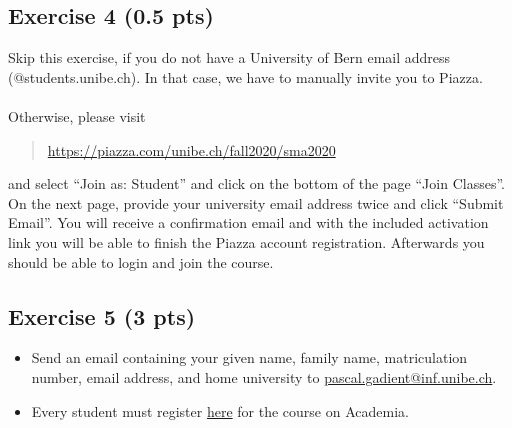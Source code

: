 \documentclass [11pt, a4wide, twoside]{article}
\begin{document}

\subsection*{Exercise 4 (0.5 pts)}
Skip this exercise, if you do not have a University of Bern email address (@students.unibe.ch). In that case, we have to manually invite you to Piazza.\\\\
Otherwise, please visit
\begin{quote}
\url{https://piazza.com/unibe.ch/fall2020/sma2020}
\end{quote}
and select ``Join as: Student'' and click on the bottom of the page ``Join Classes''. On the next page, provide your university email address twice and click ``Submit Email''. You will receive a confirmation email and with the included activation link you will be able to finish the Piazza account registration. Afterwards you should be able to login and join the course. 

\subsection*{Exercise 5 (3 pts)}
\begin{itemize}
\item Send an email containing your given name, family name, matriculation number, email address, and home university to \href{mailto:pascal.gadient@inf.unibe.ch}{pascal.gadient@inf.unibe.ch}.
\item Every student must register \href{https://www-academia.unine.ch/aai/imoniteur_pbol/ssoLogins.htm}{here} for the course on Academia.
\end{itemize}
\end{document}
